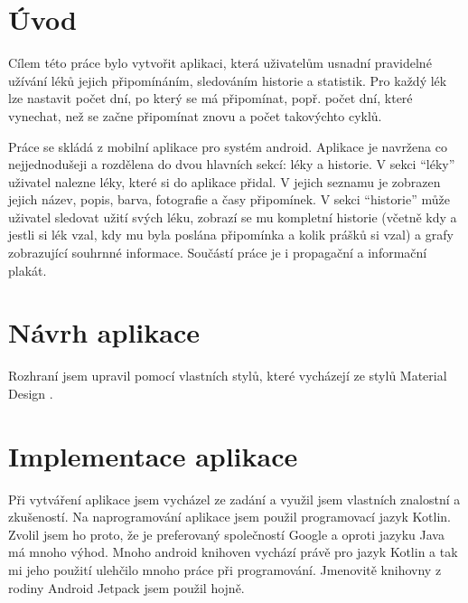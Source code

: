 \documentclass[a4paper,12pt]{report}
\begin{document}

\renewcommand\cftsecafterpnum{\vskip10pt}
\renewcommand\cftsubsecafterpnum{\vskip10pt}
\renewcommand\cftsubsubsecafterpnum{\vskip10pt}
\newpage
\tableofcontents %

\chapter*{Úvod}

Cílem této práce bylo vytvořit aplikaci, která uživatelům usnadní pravidelné užívání léků jejich připomínáním, sledováním historie a statistik. Pro každý lék lze nastavit počet dní, po který se má připomínat, popř. počet dní, které vynechat, než se začne připomínat znovu a počet takovýchto cyklů.

Práce se skládá z mobilní aplikace pro systém android. Aplikace je navržena co nejjednodušeji a rozdělena do dvou hlavních sekcí: léky a historie. V sekci \enquote{léky} uživatel nalezne léky, které si do aplikace přidal. V jejich seznamu je zobrazen jejich název, popis, barva, fotografie a časy připomínek. V sekci \enquote{historie} může uživatel sledovat užití svých léku, zobrazí se mu kompletní historie (včetně kdy a jestli si lék vzal, kdy mu byla poslána připomínka a kolik prášků si vzal) a grafy zobrazující souhrnné informace. Součástí práce je i propagační a informační plakát. 



\chapter{Návrh aplikace}

Rozhraní jsem upravil pomocí vlastních stylů, které vycházejí ze stylů Material Design \cite{materialdesign}.
\chapter{Implementace aplikace}

Při vytváření aplikace jsem vycházel ze zadání a využil jsem vlastních znalostní a zkušeností. Na naprogramování aplikace jsem použil programovací jazyk Kotlin. Zvolil jsem ho proto, že je preferovaný společností Google a oproti jazyku Java má mnoho výhod. Mnoho android knihoven vychází právě pro jazyk Kotlin a tak mi jeho použití ulehčilo mnoho práce při programování. Jmenovitě knihovny z rodiny Android Jetpack \cite{jetpack} jsem použil hojně.
\end{document}
